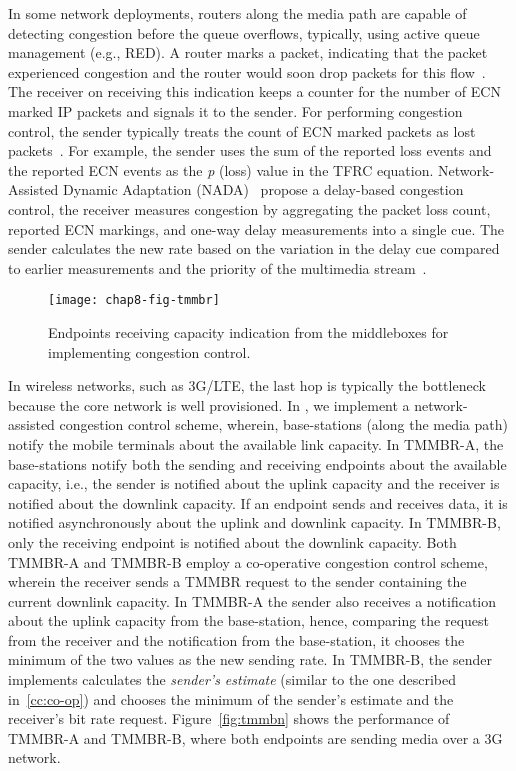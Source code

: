 In some network deployments, routers along the media path are capable of
detecting congestion before the queue overflows, typically, using active queue
management (e.g., RED). A router marks a packet, indicating that the packet
experienced congestion and the router would soon drop packets for this
flow~\cite{rfc3168}. The receiver on receiving this indication keeps a counter
for the number of ECN marked IP packets and signals it to the sender. For
performing congestion control, the sender typically treats the count of ECN
marked packets as lost packets~\cite{rfc6679}. For example, the sender uses
the sum of the reported loss events and the reported ECN events as the
\emph{p} (loss) value in the TFRC equation. Network-Assisted Dynamic
Adaptation (NADA)~\cite{rmcat-nada} propose a delay-based congestion control,
the receiver measures congestion by aggregating the packet loss count,
reported ECN markings, and one-way delay measurements into a single cue. The
sender calculates the new rate based on the variation in the delay cue
compared to earlier measurements and the priority of the multimedia
stream~\cite{pv-nada}.

\begin{figure}
\texttt{[image: chap8-fig-tmmbr]}
\caption{Endpoints receiving capacity indication from the middleboxes for implementing congestion control.}
\label{fig:cc:tmmbrab}
\end{figure}

In wireless networks, such as 3G/LTE, the last hop is typically the bottleneck
because the core network is well provisioned. In , we
implement a network-assisted congestion control scheme, wherein, base-stations
(along the media path) notify the mobile terminals about the available link
capacity. In TMMBR-A, the base-stations notify both the sending and receiving
endpoints about the available capacity, i.e., the sender is notified about the
uplink capacity and the receiver is notified about the downlink capacity. If
an endpoint sends and receives data, it is notified asynchronously about the
uplink and downlink capacity. In TMMBR-B, only the receiving endpoint is
notified about the downlink capacity. Both TMMBR-A and TMMBR-B employ a
co-operative congestion control scheme, wherein the receiver sends a TMMBR
request to the sender containing the current downlink capacity. In TMMBR-A the
sender also receives a notification about the uplink capacity from the
base-station, hence, comparing the request from the receiver and the
notification from the base-station, it chooses the minimum of the two values
as the new sending rate. In TMMBR-B, the sender implements calculates the
\emph{sender's estimate} (similar to the one described in~\ref{cc:co-op}) and
chooses the minimum of the sender's estimate and the receiver's bit rate
request. Figure~\ref{fig:tmmbn} shows the performance of TMMBR-A and TMMBR-B,
where both endpoints are sending media over a 3G network.

